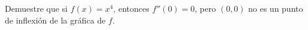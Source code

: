 \item Demuestre que si $f(x) = x^4$, entonces $f''(0) = 0$, pero $(0, 0)$ no es un punto de inflexión de la gráfica de $f$.
